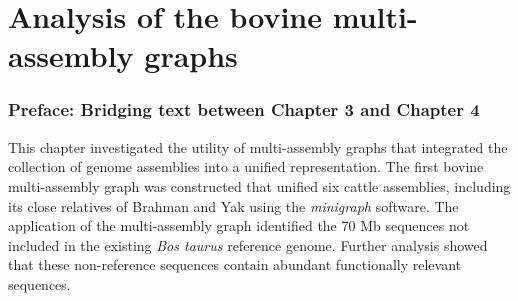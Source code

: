 \documentclass[11 pt, a4paper, notitlepage, twoside]{report}
\begin{document}




\iftwoside
\cleardoublepage
\newpage
\fi

\chapter[Bovine multi-assembly graphs]{\LARGE{Analysis of the bovine multi-assembly graphs}}
\label{chap:multigraph}

\subsection*{Preface: Bridging text between Chapter 3 and Chapter 4}

\normalsize
This chapter investigated the utility of multi-assembly graphs that integrated the collection of genome assemblies into a unified representation. The first bovine multi-assembly graph was constructed that unified six cattle assemblies, including its close relatives of Brahman and Yak using the \emph{minigraph} software. The application of the multi-assembly graph identified the 70 Mb sequences not included in the existing \emph{Bos taurus} reference genome. Further analysis showed that these non-reference sequences contain abundant functionally relevant sequences. \\

\bigskip

\begin{center}\end{center}
\end{document}
